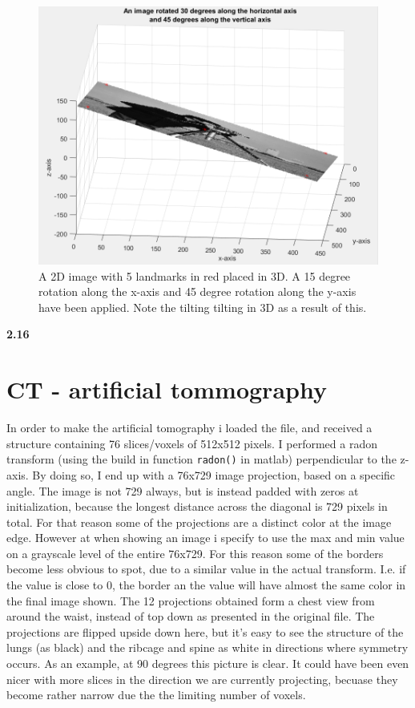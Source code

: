 \documentclass[]{article}
\begin{document}
\begin{figure}[H]
\centering
\includegraphics[scale=0.75]{ImgRotated.PNG}
\caption{A 2D image with 5 landmarks in red placed in 3D. A 15 degree rotation along the x-axis and 45 degree rotation along the y-axis have been applied. Note the tilting tilting in 3D as a result of this.}
\label{fig:2Drotate}
\end{figure}

\textbf{2.16}

\section{CT - artificial tommography}
In order to make the artificial tomography i loaded the file, and received a structure containing 76 slices/voxels of 512x512 pixels.
I performed a radon transform (using the build in function \texttt{radon()} in matlab) perpendicular to the z-axis. By doing so, I end up with a 76x729 image projection, based on a specific angle. The image is not 729 always, but is instead padded with zeros at initialization, because the longest distance across the diagonal is 729 pixels in total. For that reason some of the projections are a distinct color at the image edge. However at when showing an image i specify to use the max and min value on a grayscale level of the entire 76x729. For this reason some of the borders become less obvious to spot, due to a similar value in the actual transform. I.e. if the value is close to 0, the border an the value will have almost the same color in the final image shown. The 12 projections obtained form a chest view from around the waist, instead of top down as presented in the original file. The projections are flipped upside down here, but it's easy to see the structure of the lungs (as black) and the ribcage and spine as white in directions where symmetry occurs. As an example, at 90 degrees this picture is clear. It could have been even nicer with more slices in the direction we are currently projecting, becuase they become rather narrow due the the limiting number of voxels.
\end{document}
